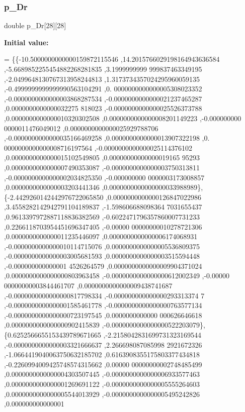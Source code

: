 \subsubsection{\texorpdfstring{p\+\_\+\+Dr}{p\_Dr}}
{\footnotesize\ttfamily double p\+\_\+\+Dr\mbox{[}28\mbox{]}\mbox{[}28\mbox{]}}

{\bfseries Initial value\+:}
\begin{DoxyCode}
= \{\{-10.5000000000000159872115546 ,14.2015766029198164943636584 ,-5.6689852255454882268281835 ,3.1999999999
      999837463349195 ,-2.0499648130767313958244813 ,1.3173734357024295960059135 ,-0.4999999999999990563104291 ,0.
      0000000000000005308023352 ,-0.0000000000000003868287534 ,-0.0000000000000021237465287 ,0.0000000000000032275
      818023 ,-0.0000000000000025526373788 ,0.0000000000000010320302508 ,0.0000000000000008201149223 ,-0.000000000
      0000011476049012 ,0.0000000000000025929788706 ,-0.0000000000000035166469258 ,0.0000000000000013907322198 ,0.
      0000000000000008716197564 ,-0.0000000000000025114376102 ,0.0000000000000015102549805 ,0.00000000000000019165
      95293 ,0.0000000000000007490353087 ,-0.0000000000000003750313811 ,-0.0000000000000002034825350 ,-0.000000000
      0000003173008857 ,0.0000000000000003203441346 ,0.0000000000000000033988989\},
\{-2.4429260142442976722065850 ,0.0000000000000126847022986 ,3.4558282142942791104189837 ,-1.598606688098364
      7031655437 ,0.9613397972887118836382569 ,-0.6022471796357860007731233 ,0.2266118703954451696347405 ,-0.00000
      00000000010278721306 ,0.0000000000000011235446097 ,0.0000000000000006174068931 ,-0.0000000000000010114715076
       ,0.0000000000000005536809375 ,-0.0000000000000003005681593 ,0.0000000000000003515594448 ,-0.000000000000001
      4526264579 ,0.0000000000000009904371024 ,0.0000000000000000803963458 ,-0.0000000000000000612002349 ,-0.00000
      00000000003844461707 ,0.0000000000000009438741687 ,-0.0000000000000000817798334 ,-0.000000000000000293313374
      7 ,-0.0000000000000001585461778 ,-0.0000000000000000763577134 ,-0.0000000000000000723197545 ,0.0000000000000
      000626646618 ,0.0000000000000000902415839 ,-0.0000000000000000522203079\},
\{0.6252566655153439789671665 ,-2.2158042831699731323169544 ,-0.0000000000000003321666637 ,2.266698087085998
      2921672326 ,-1.0664419040063750632185702 ,0.6163908355175803377434818 ,-0.2260994009425748574315662 ,0.00000
      00000000002748485499 ,0.0000000000000004303507445 ,-0.0000000000000006933577463 ,0.0000000000000001269691122
       ,-0.0000000000000005555264603 ,0.0000000000000005544013929 ,-0.0000000000000005495242826 ,0.000000000000001

\end{DoxyCode}
